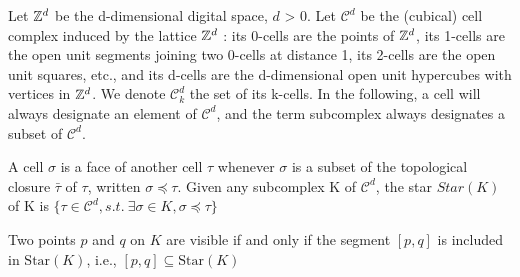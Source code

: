 \documentclass[runningheads]{llncs}
\begin{document}
    Let $\mathbb{Z}^d$ be the d-dimensional digital space, $d$ > 0.
    Let $\mathcal{C}^d$ be the (cubical) cell complex induced by the lattice $\mathbb{Z}^d$ : its 0-cells are the points of $\mathbb{Z}^d$, its 1-cells are the open unit segments joining two 0-cells at distance 1, its 2-cells are the open unit squares, etc., and its d-cells are the d-dimensional open unit hypercubes with vertices in $\mathbb{Z}^d$.
    We denote $\mathcal{C}^d_k$ the set of its k-cells.
    In the following, a cell will always designate an element of $\mathcal{C}^d$, and the term subcomplex always designates a subset of $\mathcal{C}^d$.

    A cell $\sigma$ is a face of another cell $\tau$ whenever $\sigma$ is a subset of the topological closure $\bar{\tau}$ of $\tau$, written $\sigma \preccurlyeq \tau$.
    Given any subcomplex K of $\mathcal{C}^d$, the star $Star(K)$ of K is $\{\tau \in \mathcal{C}^d, s.t.\ \exists\sigma \in K,\sigma \preccurlyeq \tau\}$

    \begin{definition}
        Two points \( p \) and \( q \) on \( K \) are visible if and only if the segment \([p, q]\) is included in \(\text{Star}(K)\), i.e., \( [p, q] \subseteq \text{Star}(K)\)
    \end{definition}
\end{document}
